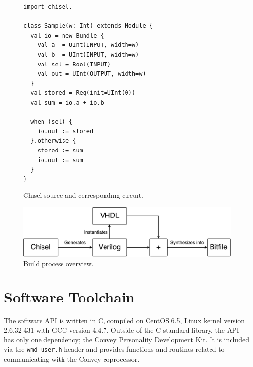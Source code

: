\begin{figure}
\begin{mintedsubfloat}{0.5\linewidth}
\begin{verbatim}
import chisel._

class Sample(w: Int) extends Module {
  val io = new Bundle {
    val a  = UInt(INPUT, width=w)
    val b  = UInt(INPUT, width=w)
    val sel = Bool(INPUT)
    val out = UInt(OUTPUT, width=w)
  }
  val stored = Reg(init=UInt(0))
  val sum = io.a + io.b

  when (sel) {
    io.out := stored
  }.otherwise {
    stored := sum
    io.out := sum
  }
} 
\end{verbatim} 
\end{mintedsubfloat}
\caption[Chisel source and corresponding circuit]{Chisel source and corresponding circuit.}
\label{fig:chisel-sample}
\end{figure}

\begin{figure}[ht]
  \centering
  \includegraphics[width=0.8\linewidth]{fig/hardware-build-process}
  \caption[Build process overview]{Build process overview.\label{fig:hw-build-process} }
\end{figure}

\section{Software Toolchain}
\label{sec:sw-toolchain}

The software API is written in C, compiled on CentOS 6.5, Linux kernel version
2.6.32-431 with GCC version 4.4.7. Outside of the C standard library, the API
has only one dependency; the Convey Personality Development Kit. It is included
via the \texttt{wmd\_user.h} header and provides functions and routines related
to communicating with the Convey coprocessor.


\cleardoublepage
